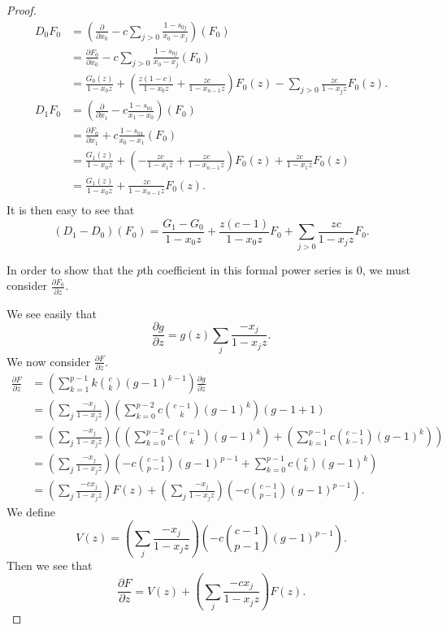 \documentclass{amsart}
\numberwithin{equation}{section}
\theoremstyle{definition}
\begin{document}
\begin{proof}
\begin{align*}
D_0F_0&=\left(\frac{\partial}{\partial x_0}-c\sum_{j > 0} \frac{1-s_{0j}}{x_0-x_j}\right)(F_0)\\
&=\frac{\partial F_0}{\partial x_0}-c\sum_{j > 0} \frac{1-s_{0j}}{x_0-x_j}(F_0)\\
&=\frac{G_0(z)}{1-x_0z}+\left(\frac{z(1-c)}{1-x_0z}+\frac{zc}{1-x_{n-1}z}\right)F_0(z)-\sum_{j > 0} \frac{zc}{1-x_jz}F_0(z).\\
D_1F_0&=\left(\frac{\partial}{\partial x_1}-c \frac{1-s_{01}}{x_1-x_0}\right)(F_0)\\
&=\frac{\partial F_0}{\partial x_1}+c \frac{1-s_{01}}{x_0-x_1}(F_0)\\
&=\frac{G_1(z)}{1-x_0z}+\left(-\frac{zc}{1-x_1z}+\frac{zc}{1-x_{n-1}z}\right)F_0(z)+\frac{zc}{1-x_1z}F_0(z)\\
&=\frac{G_1(z)}{1-x_0z}+\frac{zc}{1-x_{n-1}z}F_0(z).\\
\end{align*}
It is then easy to see that $$(D_1-D_0)(F_0)=\frac{G_1-G_0}{1-x_0z}+\frac{z(c-1)}{1-x_0z}F_0+\sum_{j>0} \frac{zc}{1-x_jz}F_0.$$

In order to show that the $p$th coefficient in this formal power series is $0$, we must consider $\frac{\partial F_0}{\partial z}$. 

We see easily that $$\frac{\partial g}{\partial z} = g(z) \sum_j \frac{-x_j}{1-x_jz}.$$ We now consider $\frac{\partial F}{\partial z}$.
\begin{align*}
\frac{\partial F}{\partial z}%
&=\left(\sum_{k=1}^{p-1}k\binom{c}{k}(g-1)^{k-1}\right)\frac{\partial g}{\partial z}\\
&=\left(\sum_j \frac{-x_j}{1-x_jz}\right)\left(\sum_{k=0}^{p-2}c\binom{c-1}{k}(g-1)^{k}\right)(g-1+1)\\
&=\left(\sum_j \frac{-x_j}{1-x_jz}\right)\left(\left(\sum_{k=0}^{p-2}c\binom{c-1}{k}(g-1)^{k}\right)+\left(\sum_{k=1}^{p-1}c\binom{c-1}{k-1}(g-1)^{k}\right)\right)\\
&=\left(\sum_j \frac{-x_j}{1-x_jz}\right)\left(-c\binom{c-1}{p-1}(g-1)^{p-1}+\sum_{k=0}^{p-1}c\binom{c}{k}(g-1)^{k}\right)\\
&=\left(\sum_j \frac{-cx_j}{1-x_jz}\right)F(z)+\left(\sum_j \frac{-x_j}{1-x_jz}\right)\left(-c\binom{c-1}{p-1}(g-1)^{p-1}\right).
\end{align*}
We define $$V(z)=\left(\sum_j \frac{-x_j}{1-x_jz}\right)\left(-c\binom{c-1}{p-1}(g-1)^{p-1}\right).$$ Then we see that $$\frac{\partial F}{\partial z}=V(z)+\left(\sum_j \frac{-cx_j}{1-x_jz}\right)F(z).$$


\end{proof}
\end{document}
